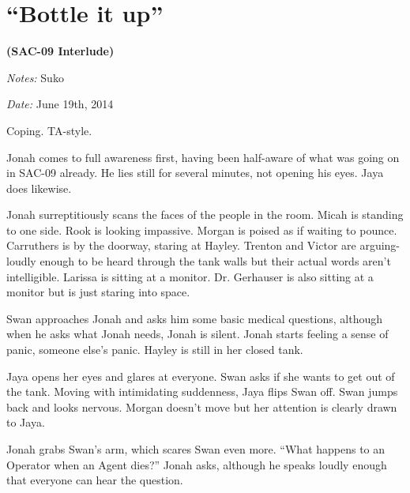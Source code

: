 \setcounter{chapter}{ 25 }
\chapter{\textbf{``Bottle it up''} }




\begin{center}
 {\LARGE \textbf{(SAC-09 Interlude)} } 
\end{center}




\textit{Notes:} Suko

\textit{Date:} June 19th, 2014



Coping.  TA-style.



\noindent\hrulefill





Jonah comes to full awareness first, having been half-aware of what was going on in SAC-09 already.  He lies still for several minutes, not opening his eyes.  Jaya does likewise.



Jonah surreptitiously scans the faces of the people in the room.  Micah is standing to one side.  Rook is looking impassive.  Morgan is poised as if waiting to pounce.  Carruthers is by the doorway, staring at Hayley.  Trenton and Victor are arguing- loudly enough to be heard through the tank walls but their actual words aren't intelligible.  Larissa is sitting at a monitor.  Dr. Gerhauser is also sitting at a monitor but is just staring into space.



Swan approaches Jonah and asks him some basic medical questions, although when he asks what Jonah needs, Jonah is silent.  Jonah starts feeling a sense of panic, someone else's panic.  Hayley is still in her closed tank.



Jaya opens her eyes and glares at everyone.  Swan asks if she wants to get out of the tank.  Moving with intimidating suddenness, Jaya flips Swan off.  Swan jumps back and looks nervous.  Morgan doesn't move but her attention is clearly drawn to Jaya.



Jonah grabs Swan's arm, which scares Swan even more.  ``What happens to an Operator when an Agent dies?'' Jonah asks, although he speaks loudly enough that everyone can hear the question.

